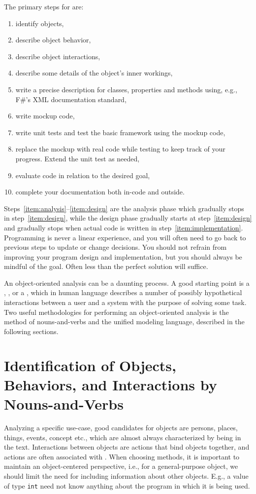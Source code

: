 \documentclass[fsharpNotes.tex]{subfiles}
\begin{document}
The primary steps for  are:
\begin{enumerate}
\item identify objects,\label{item:analysis}\label{item:identifyObjects}
\item describe object behavior, \label{item:objectBehaviour}
\item describe object interactions, \label{item:objectInteraction}
\item describe some details of the object's inner workings,\label{item:design}\label{item:objectDetails}
\item write a precise description for classes, properties and methods using, e.g., F\#'s XML documentation standard,
\item write mockup code,  \label{item:objectMockup}
\item write unit tests and test the basic framework using the mockup code,\label{item:implementation}
\item replace the mockup with real code while testing to keep track of
  your progress. Extend the unit test as needed,
\item evaluate code in relation to the desired goal,
\item complete your documentation both in-code and outside.
\end{enumerate}
Steps~\ref{item:analysis}--\ref{item:design} are the analysis phase which gradually stops in step~\ref{item:design}, while the design phase gradually starts at step~\ref{item:design} and gradually stops when actual code is written in step~\ref{item:implementation}. Programming is never a linear experience, and you will often need to go back to previous steps to update or change decisions. You should not refrain from improving your program design and implementation, but you should always be mindful of the goal. Often less than the perfect solution will suffice.

An object-oriented analysis can be a daunting process. A good starting point is a , , or a , which in human language describes a number of possibly hypothetical interactions between a user and a system with the purpose of solving some task. Two useful methodologies for performing an object-oriented analysis is the method of nouns-and-verbs and the unified modeling language, described in the following sections.

\section{Identification of Objects, Behaviors, and Interactions by Nouns-and-Verbs}
Analyzing a specific use-case, good candidates for objects are persons, places, things, events, concept etc., which are almost always characterized by being  in the text. Interactions between objects are actions that bind objects together, and actions are often associated with . When choosing methods, it is important to maintain an object-centered perspective, i.e., for a general-purpose object, we should limit the need for including information about other objects. E.g., a value of type \lstinline|int| need not know anything about the program in which it is being used.
\end{document}
